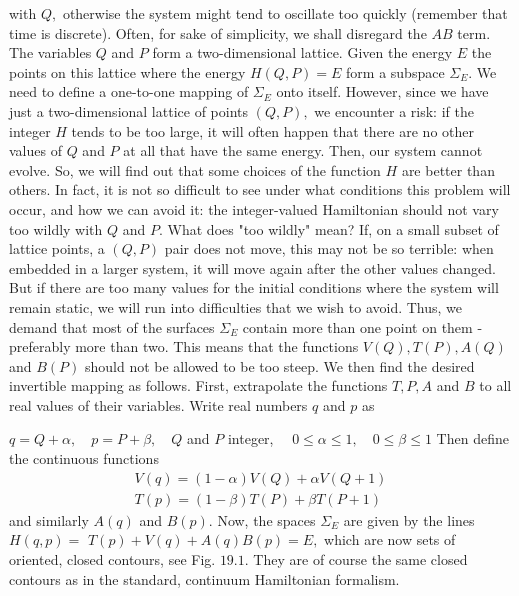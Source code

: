 \documentclass[main.tex]{subfiles}
\begin{document}
with $Q,$ otherwise the system might tend to oscillate too quickly (remember that time is discrete). Often, for sake of simplicity, we shall disregard the $A B$ term. The variables $Q$ and $P$ form a two-dimensional lattice. Given the energy $E$ the points on this lattice where the energy $H(Q, P)=E$ form a subspace $\Sigma_{E} .$ We need to define a one-to-one mapping of $\Sigma_{E}$ onto itself. However, since we have just a two-dimensional lattice of points $(Q, P),$ we encounter a risk: if the integer $H$ tends to be too large, it will often happen that there are no other values of $Q$ and $P$ at all that have the same energy. Then, our system cannot evolve. So, we will find out that some choices of the function $H$ are better than others. In fact, it is not so difficult to see under what conditions this problem will occur, and how we can avoid it: the integer-valued Hamiltonian should not vary too wildly with $Q$ and $P .$ What does "too wildly" mean? If, on a small subset of lattice points, a $(Q, P)$ pair does not move, this may not be so terrible: when embedded in a larger system, it will move again after the other values changed. But if there are too many values for the initial conditions where the system will remain static, we will run into difficulties that we wish to avoid. Thus, we demand that most of the surfaces $\Sigma_{E}$ contain more than one point on them - preferably more than two. This means that the functions
$V(Q), T(P), A(Q)$ and $B(P)$ should not be allowed to be too steep. We then find the desired invertible mapping as follows. First, extrapolate the functions $T, P, A$ and $B$ to all real values of their variables. Write real numbers $q$ and $p$ as

$q=Q+\alpha, \quad p=P+\beta, \quad Q$ and $P$ integer, $\quad 0 \leq \alpha \leq 1, \quad 0 \leq \beta \leq 1$
Then define the continuous functions
$$
\begin{array}{l}
{V(q)=(1-\alpha) V(Q)+\alpha V(Q+1)} \\
{T(p)=(1-\beta) T(P)+\beta T(P+1)}
\end{array}
$$
and similarly $A(q)$ and $B(p) .$ Now, the spaces $\Sigma_{E}$ are given by the lines $H(q, p)=$ $T(p)+V(q)+A(q) B(p)=E,$ which are now sets of oriented, closed contours, see Fig. $19.1 .$ They are of course the same closed contours as in the standard, continuum Hamiltonian formalism.
\end{document}
